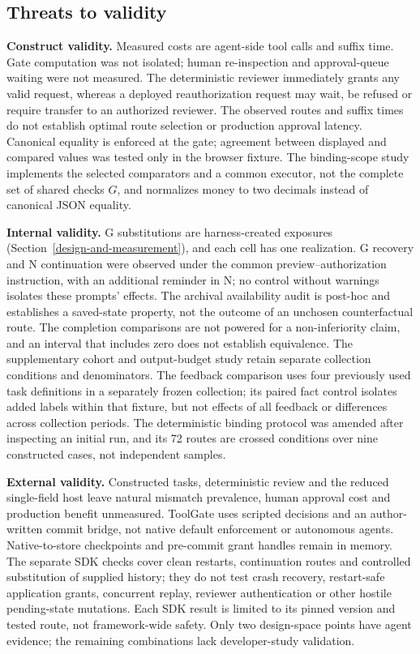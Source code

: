 \documentclass[pdflatex,sn-basic]{sn-jnl}
\begin{document}
\subsection{Threats to validity}\label{threats-to-validity}

\textbf{Construct validity.} Measured costs are agent-side tool calls and suffix time. Gate computation was not isolated; human re-inspection and approval-queue waiting were not measured. The deterministic reviewer immediately grants any valid request, whereas a deployed reauthorization request may wait, be refused or require transfer to an authorized reviewer. The observed routes and suffix times do not establish optimal route selection or production approval latency. Canonical equality is enforced at the gate; agreement between displayed and compared values was tested only in the browser fixture. The binding-scope study implements the selected comparators and a common executor, not the complete set of shared checks \(G\), and normalizes money to two decimals instead of canonical JSON equality.

\textbf{Internal validity.} G substitutions are harness-created exposures (Section~\ref{design-and-measurement}), and each cell has one realization. G recovery and N continuation were observed under the common preview--authorization instruction, with an additional reminder in N; no control without warnings isolates these prompts' effects. The archival availability audit is post-hoc and establishes a saved-state property, not the outcome of an unchosen counterfactual route. The completion comparisons are not powered for a non-inferiority claim, and an interval that includes zero does not establish equivalence. The supplementary cohort and output-budget study retain separate collection conditions and denominators. The feedback comparison uses four previously used task definitions in a separately frozen collection; its paired fact control isolates added labels within that fixture, but not effects of all feedback or differences across collection periods. The deterministic binding protocol was amended after inspecting an initial run, and its 72 routes are crossed conditions over nine constructed cases, not independent samples.

\textbf{External validity.} Constructed tasks, deterministic review and the reduced single-field host leave natural mismatch prevalence, human approval cost and production benefit unmeasured. ToolGate uses scripted decisions and an author-written commit bridge, not native default enforcement or autonomous agents. Native-to-store checkpoints and pre-commit grant handles remain in memory. The separate SDK checks cover clean restarts, continuation routes and controlled substitution of supplied history; they do not test crash recovery, restart-safe application grants, concurrent replay, reviewer authentication or other hostile pending-state mutations. Each SDK result is limited to its pinned version and tested route, not framework-wide safety. Only two design-space points have agent evidence; the remaining combinations lack developer-study validation.
\end{document}
